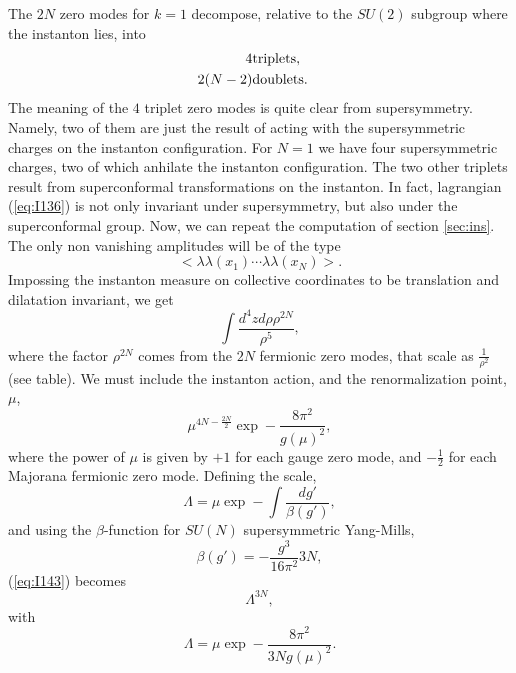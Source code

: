 The $2N$ zero modes for $k=1$ decompose, relative to the $SU(2)$
subgroup where the instanton lies, into
\begin{eqnarray}
4 & \hbox {triplets}, & \nonumber \\
2(N-2) & \hbox {doublets}. &
\label{eqnarray}
\end{eqnarray}
The meaning of the $4$ triplet zero modes is quite clear from
supersymmetry. Namely, two of them are just the result of acting
with the supersymmetric charges on the instanton configuration.
For $N\!=\!1$ we have four supersymmetric charges,
two of which anhilate the instanton configuration. The two other
triplets result from superconformal transformations on the
instanton. In fact, lagrangian (\ref{eq:I136}) is not only
invariant under supersymmetry, but also under the superconformal
group. Now, we can repeat the computation of section
\ref{sec:ins}. The only non vanishing amplitudes will be of the
type
\begin{equation}
<\lambda \lambda(x_1) \cdots \lambda \lambda(x_N)>.
\label{eq:I141}
\end{equation}
Impossing the instanton measure on collective coordinates to
be translation and dilatation invariant, we get
\begin{equation}
\int \frac {d^4 z d\rho \rho^{2N}}{\rho^{5}},
\label{eq:I142}
\end{equation}
where the factor $\rho^{2N}$ comes from the $2N$ fermionic zero
modes, that scale as $\frac {1}{\rho^2}$ (see table). We
must include the instanton action, and the renormalization
point, $\mu$,
\begin{equation}
\mu^{4N-\frac {2N}{2}} \exp - \frac {8 \pi^2}{g(\mu)^2},
\label{eq:I143}
\end{equation}
where the power of $\mu$ is given by $+1$ for each gauge zero
mode, and $- \frac {1}{2}$ for each Majorana fermionic zero mode.
Defining the scale,
\begin{equation}
\Lambda = \mu \exp - \int \frac {dg'}{\beta(g')},
\label{eq:I144}
\end{equation}
and using the $\beta$-function for $SU(N)$ supersymmetric
Yang-Mills,
\begin{equation}
\beta(g') = - \frac {g^3}{16\pi^2} 3N,
\label{eq:I145}
\end{equation}
(\ref{eq:I143}) becomes
\begin{equation}
\Lambda^{3N},
\label{eq:I146}
\end{equation}
with 
\begin{equation}
\Lambda = \mu \exp - \frac {8 \pi^2}{3Ng(\mu)^2}.
\label{eq:I147}
\end{equation}
